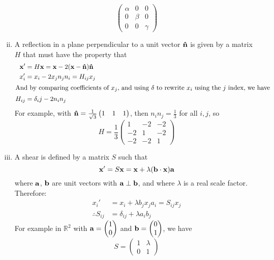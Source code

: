 \documentclass{article}
\begin{document}
\begin{enumerate}[(i)]
	      \[ \begin{pmatrix}
			      \alpha & 0     & 0      \\
			      0      & \beta & 0      \\
			      0      & 0     & \gamma
		      \end{pmatrix} \]
	\item A reflection in a plane perpendicular to a unit vector $\vu n$ is given by a matrix $H$ that must have the property that
	      \begin{align*}
		      \vb x' & = H \vb x = \vb x - 2(\vb x - \vu n) \vu n \\
		      x_i'   & = x_i - 2x_jn_jn_i = H_{ij}x_j             \\
		      \intertext{And by comparing coefficients of $x_j$, and using $\delta$ to rewrite $x_i$ using the $j$ index, we have}
		      H_{ij} & = \delta_ij - 2n_in_j
	      \end{align*}
	      For example, with $\vu n = \frac{1}{\sqrt 3}\begin{pmatrix}
			      1 & 1 & 1
		      \end{pmatrix}$, then $n_in_j = \frac{1}{3}$ for all $i, j$, so
	      \[ H = \frac{1}{3}\begin{pmatrix}
			      1  & -2 & -2 \\
			      -2 & 1  & -2 \\
			      -2 & -2 & 1
		      \end{pmatrix} \]
	\item A shear is defined by a matrix $S$ such that
	      \[ \vb x' = S\vb x = \vb x + \lambda(\vb b \cdot \vb x)\vb a \]
	      where $\vb a$, $\vb b$ are unit vectors with $\vb a \perp \vb b$, and where $\lambda$ is a real scale factor. Therefore:
	      \begin{align*}
		      x_i'              & = x_i + \lambda b_j x_j a_i = S_{ij}x_j \\
		      \therefore S_{ij} & = \delta_{ij} + \lambda a_i b_j
	      \end{align*}
	      For example in $\mathbb R^2$ with $\vb a = \begin{pmatrix}
			      1 \\ 0
		      \end{pmatrix}$ and $\vb b = \begin{pmatrix}
			      0 \\ 1
		      \end{pmatrix}$, we have
	      \[ S = \begin{pmatrix}
			      1 & \lambda \\ 0 & 1

\end{pmatrix}\]
\end{enumerate}
\end{document}
